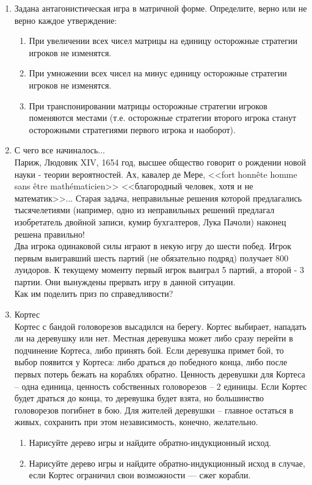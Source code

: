 \documentclass[pdftex,12pt,a4paper]{article}
\begin{document}
\begin{enumerate}
\item Задана антагонистическая игра в матричной форме. Определите, верно или не верно каждое утверждение:
\begin{enumerate}
\item При увеличении всех чисел матрицы на единицу осторожные стратегии игроков не изменятся.
\item При умножении всех чисел на минус единицу осторожные стратегии игроков не изменятся.
\item При транспонировании матрицы осторожные стратегии игроков поменяются местами (т.е. осторожные стратегии второго игрока станут осторожными стратегиями первого игрока и наоборот).
\end{enumerate}

\item С чего все начиналось... \\
Париж, Людовик XIV, 1654 год, высшее общество говорит о рождении новой науки - теории вероятностей. Ах, кавалер де Мере, <<fort honn\^ete homme sans \^etre math\'ematicien>> <<благородный человек, хотя и не математик>>... Старая задача, неправильные решения которой предлагались тысячелетиями (например, одно из неправильных решений предлагал изобретатель двойной записи, кумир бухгалтеров, Лука Пачоли) наконец решена правильно!\\
Два игрока одинаковой силы играют в некую игру до шести побед. Игрок первым выигравший шесть партий (не обязательно подряд) получает 800 луидоров. К текущему моменту первый игрок выиграл 5 партий, а второй - 3 партии. Они вынуждены прервать игру в данной ситуации.\\
Как им поделить приз по справедливости?

\item Кортес\\
Кортес с бандой головорезов высадился на берегу. Кортес выбирает, нападать ли на деревушку или нет. Местная деревушка может либо сразу перейти в подчинение Кортеса, либо принять бой. Если деревушка примет бой, то выбор появится у Кортеса: либо драться до победного конца, либо после первых потерь бежать на кораблях обратно. Ценность деревушки для Кортеса – одна единица, ценность собственных головорезов – 2 единицы. Если Кортес будет драться до конца, то деревушка будет взята, но большинство головорезов погибнет в бою. Для жителей деревушки – главное остаться в живых, сохранить при этом независимость, конечно, желательно. 
\begin{enumerate}
\item Нарисуйте дерево игры и найдите обратно-индукционный исход.
\item Нарисуйте дерево игры и найдите обратно-индукционный исход в случае, если Кортес ограничил свои возможности --- сжег корабли.
\end{enumerate}

\end{enumerate}
\end{document}
